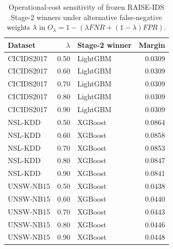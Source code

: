 \begin{table}[!htbp]
\centering
\caption{Operational-cost sensitivity of frozen RAISE-IDS Stage-2 winners under alternative false-negative weights $\lambda$ in $O_\lambda=1-(\lambda FNR+(1-\lambda)FPR)$.}
\label{tab:raise_ids_o_cost_sensitivity}
\small
\begin{tabular}{lrlr}
\toprule
Dataset & $\lambda$ & Stage-2 winner & Margin \\
\midrule
CICIDS2017 & 0.50 & LightGBM & 0.0309 \\
CICIDS2017 & 0.60 & LightGBM & 0.0309 \\
CICIDS2017 & 0.70 & LightGBM & 0.0309 \\
CICIDS2017 & 0.80 & LightGBM & 0.0309 \\
CICIDS2017 & 0.90 & LightGBM & 0.0309 \\
NSL-KDD & 0.50 & XGBoost & 0.0864 \\
NSL-KDD & 0.60 & XGBoost & 0.0858 \\
NSL-KDD & 0.70 & XGBoost & 0.0853 \\
NSL-KDD & 0.80 & XGBoost & 0.0847 \\
NSL-KDD & 0.90 & XGBoost & 0.0841 \\
UNSW-NB15 & 0.50 & XGBoost & 0.0438 \\
UNSW-NB15 & 0.60 & XGBoost & 0.0440 \\
UNSW-NB15 & 0.70 & XGBoost & 0.0443 \\
UNSW-NB15 & 0.80 & XGBoost & 0.0446 \\
UNSW-NB15 & 0.90 & XGBoost & 0.0448 \\
\bottomrule
\end{tabular}
\end{table}

